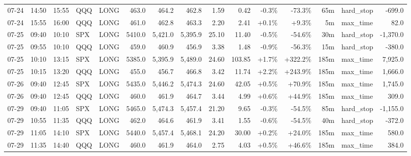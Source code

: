 \documentclass[11pt,a4paper,twoside]{article}
\begin{document}
\begin{landscape}
\begin{center}
\begin{longtable}{>{\color{txtmain}}l l l l l r r r r r r r r >{\color{txtmain}}l r}
07-24 & 14:50 & 15:55 & QQQ & LONG & 463.0 & 464.2 & 462.8 & 1.59 & 0.42 & \textcolor{lossred}{-0.3\%} & \textcolor{lossred}{-73.3\%} & 65m & hard\_stop & \textcolor{lossred}{-699.0} \\
07-24 & 15:55 & 16:00 & QQQ & LONG & 461.0 & 462.8 & 463.3 & 2.20 & 2.41 & \textcolor{wingreen}{+0.1\%} & \textcolor{wingreen}{+9.3\%} & 5m & max\_time & \textcolor{wingreen}{82.0} \\
07-25 & 09:40 & 10:10 & SPX & LONG & 5410.0 & 5,421.0 & 5,395.9 & 25.10 & 11.40 & \textcolor{lossred}{-0.5\%} & \textcolor{lossred}{-54.6\%} & 30m & hard\_stop & \textcolor{lossred}{-1,370.0} \\
07-25 & 09:55 & 10:10 & QQQ & LONG & 459.0 & 460.9 & 456.9 & 3.38 & 1.48 & \textcolor{lossred}{-0.9\%} & \textcolor{lossred}{-56.3\%} & 15m & hard\_stop & \textcolor{lossred}{-380.0} \\
07-25 & 10:10 & 13:15 & SPX & LONG & 5385.0 & 5,395.9 & 5,489.0 & 24.60 & 103.85 & \textcolor{wingreen}{+1.7\%} & \textcolor{wingreen}{+322.2\%} & 185m & max\_time & \textcolor{wingreen}{7,925.0} \\
07-25 & 10:15 & 13:20 & QQQ & LONG & 455.0 & 456.7 & 466.8 & 3.42 & 11.74 & \textcolor{wingreen}{+2.2\%} & \textcolor{wingreen}{+243.9\%} & 185m & max\_time & \textcolor{wingreen}{1,666.0} \\
07-26 & 09:40 & 12:45 & SPX & LONG & 5435.0 & 5,446.2 & 5,474.3 & 24.60 & 42.05 & \textcolor{wingreen}{+0.5\%} & \textcolor{wingreen}{+70.9\%} & 185m & max\_time & \textcolor{wingreen}{1,745.0} \\
07-26 & 09:40 & 12:45 & QQQ & LONG & 460.0 & 461.9 & 464.7 & 3.44 & 4.99 & \textcolor{wingreen}{+0.6\%} & \textcolor{wingreen}{+44.9\%} & 185m & max\_time & \textcolor{wingreen}{309.0} \\
07-29 & 09:40 & 11:05 & SPX & LONG & 5465.0 & 5,474.3 & 5,457.4 & 21.20 & 9.65 & \textcolor{lossred}{-0.3\%} & \textcolor{lossred}{-54.5\%} & 85m & hard\_stop & \textcolor{lossred}{-1,155.0} \\
07-29 & 10:55 & 11:35 & QQQ & LONG & 462.0 & 464.6 & 461.9 & 3.41 & 1.55 & \textcolor{lossred}{-0.6\%} & \textcolor{lossred}{-54.5\%} & 40m & hard\_stop & \textcolor{lossred}{-372.0} \\
07-29 & 11:05 & 14:10 & SPX & LONG & 5440.0 & 5,457.4 & 5,468.1 & 24.20 & 30.00 & \textcolor{wingreen}{+0.2\%} & \textcolor{wingreen}{+24.0\%} & 185m & max\_time & \textcolor{wingreen}{580.0} \\
07-29 & 11:35 & 14:40 & QQQ & LONG & 460.0 & 461.9 & 464.0 & 2.75 & 4.03 & \textcolor{wingreen}{+0.5\%} & \textcolor{wingreen}{+46.6\%} & 185m & max\_time & \textcolor{wingreen}{384.0} \\

\end{longtable}
\end{center}
\end{landscape}
\end{document}
